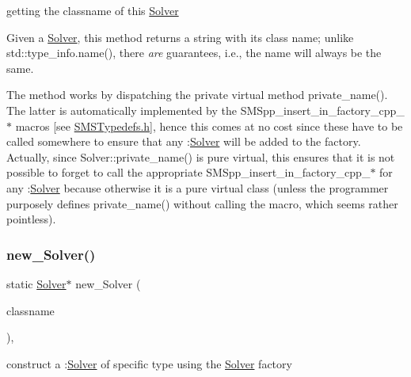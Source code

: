 getting the classname of this \mbox{\hyperlink{class_s_m_spp__di__unipi__it_1_1_solver}{Solver}} 

Given a \mbox{\hyperlink{class_s_m_spp__di__unipi__it_1_1_solver}{Solver}}, this method returns a string with its class name; unlike std\+::type\+\_\+info.\+name(), there {\itshape are} guarantees, i.\+e., the name will always be the same.

The method works by dispatching the private virtual method private\+\_\+name(). The latter is automatically implemented by the S\+M\+Spp\+\_\+insert\+\_\+in\+\_\+factory\+\_\+cpp\+\_\+$\ast$ macros \mbox{[}see \mbox{\hyperlink{_s_m_s_typedefs_8h}{S\+M\+S\+Typedefs.\+h}}\mbox{]}, hence this comes at no cost since these have to be called somewhere to ensure that any \+:\mbox{\hyperlink{class_s_m_spp__di__unipi__it_1_1_solver}{Solver}} will be added to the factory. Actually, since Solver\+::private\+\_\+name() is pure virtual, this ensures that it is not possible to forget to call the appropriate S\+M\+Spp\+\_\+insert\+\_\+in\+\_\+factory\+\_\+cpp\+\_\+$\ast$ for any \+:\mbox{\hyperlink{class_s_m_spp__di__unipi__it_1_1_solver}{Solver}} because otherwise it is a pure virtual class (unless the programmer purposely defines private\+\_\+name() without calling the macro, which seems rather pointless). \mbox{\label{class_s_m_spp__di__unipi__it_1_1_solver_a0e815f782f461461f585c5635d9fea6b}} 
\subsubsection{\texorpdfstring{new\+\_\+\+Solver()}{new\_Solver()}}
{\footnotesize\ttfamily static \mbox{\hyperlink{class_s_m_spp__di__unipi__it_1_1_solver}{Solver}}$\ast$ new\+\_\+\+Solver (\begin{DoxyParamCaption}\item[{const std\+::string \&}]{classname }\end{DoxyParamCaption})\hspace{0.3cm}{\ttfamily [inline]}, {\ttfamily [static]}}



construct a \+:\mbox{\hyperlink{class_s_m_spp__di__unipi__it_1_1_solver}{Solver}} of specific type using the \mbox{\hyperlink{class_s_m_spp__di__unipi__it_1_1_solver}{Solver}} factory 

